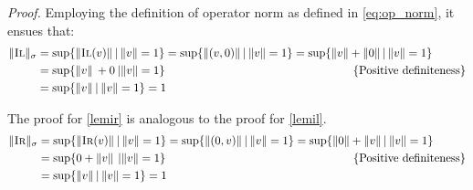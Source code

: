 \textit{Proof.} \quad Employing the definition of operator norm as defined in \autoref{eq:op_norm}, it ensues that:
\begin{equation} 
\begin{split}
  \lVert \textsc{Il} \rVert_{\sigma} &= \text{sup} \{\lVert \textsc{Il} (v) \rVert \hspace{2pt} \vert \hspace{2pt}  \lVert v\rVert =1 \} = \text{sup} \{\lVert (v,0) \rVert \hspace{2pt} \vert \hspace{2pt}  \lVert v\rVert =1 \} = \text{sup} \{\lVert v \rVert + \lVert 0 \rVert  \hspace{2pt} \vert \hspace{2pt}  \lVert v\rVert =1 \} \\
  & = \text{sup} \{\lVert v \rVert \hspace{2pt} + 0    \hspace{2pt}  \vert \lVert v\rVert =1 \} \hspace{160 pt} \text{ \{Positive definiteness\}} \\
  & = \text{sup} \{\lVert v \rVert \hspace{2pt} \vert \hspace{2pt}  \lVert v\rVert =1 \} = 1
\end{split}
\end{equation}

The proof for \autoref{lemir} is analogous to the proof for \autoref{lemil}.
\begin{equation} 
  \begin{split}
    \lVert \textsc{Ir} \rVert_{\sigma} &= \text{sup} \{\lVert \textsc{Ir} (v) \rVert \hspace{2pt} \vert \hspace{2pt}  \lVert v\rVert =1 \} = \text{sup} \{\lVert (0,v) \rVert \hspace{2pt} \vert \hspace{2pt}  \lVert v\rVert =1 \} = \text{sup} \{ \lVert 0 \rVert +\lVert v \rVert   \hspace{2pt} \vert \hspace{2pt}  \lVert v\rVert =1 \} \\
    & = \text{sup} \{0+\lVert v \rVert \hspace{2pt}     \hspace{2pt}  \vert \lVert v\rVert =1 \} \hspace{160 pt} \text{ \{Positive definiteness\}} \\
    & = \text{sup} \{\lVert v \rVert \hspace{2pt} \vert \hspace{2pt}  \lVert v\rVert =1 \} = 1
  \end{split}
  \end{equation}


